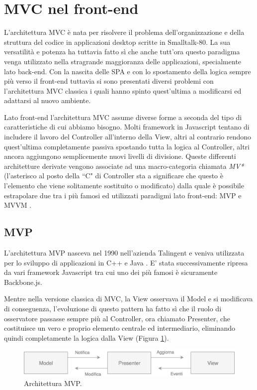 \section{MVC nel front-end}
L'architettura MVC è nata per risolvere il problema dell'organizzazione e della struttura del codice in applicazioni desktop scritte in Smalltalk-80. La sua versatilità e potenza ha tuttavia fatto sì che anche tutt'ora questo paradigma venga utilizzato nella stragrande maggioranza delle applicazioni, specialmente lato back-end.
Con la nascita delle SPA e con lo spostamento della logica sempre più verso il front-end tuttavia si sono presentati diversi problemi con l'architettura MVC classica i quali hanno spinto quest'ultima a modificarsi ed adattarsi al nuovo ambiente.

Lato front-end l'architettura MVC assume diverse forme a seconda del tipo di caratteristiche di cui abbiamo bisogno. Molti framework in Javascript tentano di includere il lavoro del Controller all'interno della View, altri al contrario rendono quest'ultima completamente passiva spostando tutta la logica al Controller, altri ancora aggiungono semplicemente nuovi livelli di divisione. Queste differenti architetture derivate vengono associate ad una macro-categoria chiamata \textit{MV*} (l'asterisco al posto della “C" di Controller sta a significare che questo è l'elemento che viene solitamente sostituito o modificato) dalla quale è possibile estrapolare due tra i più famosi ed utilizzati paradigmi lato front-end: MVP e MVVM \cite{OsmaniOnJSFrameworks}.

\subsection{MVP}
\label{ThesisMVPSection}
L'architettura MVP nasceva nel 1990 nell'azienda Talingent e veniva utilizzata per lo sviluppo di applicazioni in C++ e Java \cite{Potel1996mvp}. E' stata successivamente ripresa da vari framework Javascript tra cui uno dei più famosi è sicuramente Backbone.js.

Mentre nella versione classica di MVC, la View osservava il Model e si modificava di conseguenza, l'evoluzione di questo pattern ha fatto sì che il ruolo di osservatore passasse sempre più al Controller, ora chiamato Presenter, che costituisce un vero e proprio elemento centrale ed intermediario, eliminando quindi completamente la logica dalla View (Figura \ref{MVPworkflow}).

\begin{figure}[h]
\centering 
\vspace*{0.5cm}
\includegraphics[width=13cm]{./images/MVPworkflow}
\caption{Architettura MVP.}
\label{MVPworkflow}
\vspace*{0.5cm} 
\end{figure}

